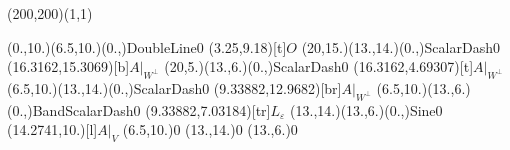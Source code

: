 \unitlength=1bp%

\begin{feynartspicture}(200,200)(1,1)

\FADiagram{}
\FAProp(0.,10.)(6.5,10.)(0.,){DoubleLine}{0}
\FALabel(3.25,9.18)[t]{$O$}
\FAProp(20,15.)(13.,14.)(0.,){ScalarDash}{0}
\FALabel(16.3162,15.3069)[b]{$A|_{W^\perp}$}
\FAProp(20,5.)(13.,6.)(0.,){ScalarDash}{0}
\FALabel(16.3162,4.69307)[t]{$A|_{W^\perp}$}
\FAProp(6.5,10.)(13.,14.)(0.,){ScalarDash}{0}
\FALabel(9.33882,12.9682)[br]{$A|_{W^\perp}$}
\FAProp(6.5,10.)(13.,6.)(0.,){BandScalarDash}{0}
\FALabel(9.33882,7.03184)[tr]{$L_\varepsilon$}
\FAProp(13.,14.)(13.,6.)(0.,){Sine}{0}
\FALabel(14.2741,10.)[l]{$A|_V$}
\FAVert(6.5,10.){0}
\FAVert(13.,14.){0}
\FAVert(13.,6.){0}
\end{feynartspicture}

